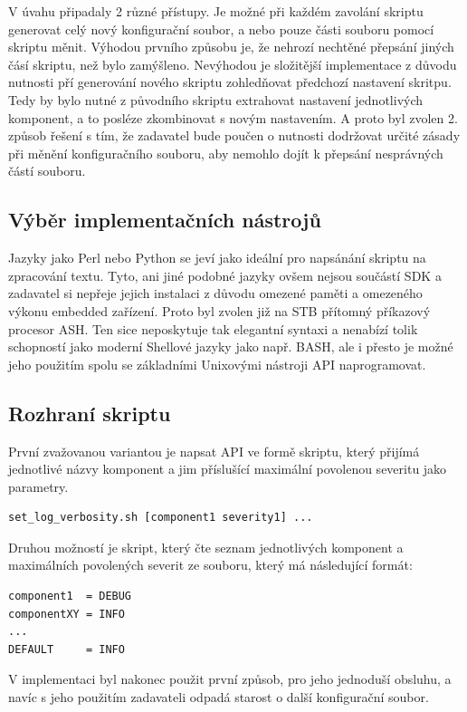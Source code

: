 \documentclass[thesis=B,czech]{FITthesis}[2012/06/26]
\begin{document}
V úvahu připadaly 2 různé přístupy. Je možné při každém zavolání skriptu generovat celý nový konfigurační soubor, a nebo pouze části souboru pomocí skriptu měnit.
Výhodou prvního způsobu je, že nehrozí nechtěné přepsání jiných čásí skriptu, než bylo zamýšleno. Nevýhodou je složitější implementace z důvodu nutnosti pří generování nového skriptu zohledňovat předchozí nastavení skritpu. Tedy by bylo nutné z původního skriptu extrahovat nastavení jednotlivých komponent, a to posléze zkombinovat s novým nastavením.
A proto byl zvolen 2. způsob řešení s tím, že zadavatel bude poučen o nutnosti dodržovat určité zásady při měnění konfiguračního souboru, aby nemohlo dojít k přepsání nesprávných částí souboru.

\subsection{Výběr implementačních nástrojů}
Jazyky jako Perl nebo Python se jeví jako ideální pro napsánání skriptu na zpracování textu. Tyto, ani jiné podobné jazyky ovšem nejsou součástí SDK  a zadavatel si nepřeje jejich instalaci z důvodu omezené paměti a omezeného výkonu embedded zařízení. Proto byl zvolen již na STB přítomný příkazový procesor ASH. Ten sice neposkytuje tak elegantní syntaxi a nenabízí tolik schopností jako moderní Shellové jazyky jako např. BASH, ale i přesto je možné jeho použitím spolu se základními Unixovými nástroji API naprogramovat.

\subsection{Rozhraní skriptu}
První zvažovanou variantou je napsat API ve formě skriptu, který přijímá jednotlivé názvy komponent a jim příslušící maximální povolenou severitu jako parametry.

\begin{lstlisting}[style=RainerScriptSimpleStyle]
set_log_verbosity.sh [component1 severity1] ...
\end{lstlisting}
Druhou možností je skript, který čte seznam jednotlivých komponent a maximálních povolených severit ze souboru, který má následující formát:

\begin{lstlisting}[style=RainerScriptSimpleStyle]
component1  = DEBUG
componentXY = INFO
...
DEFAULT     = INFO
\end{lstlisting}
V implementaci byl nakonec použit první způsob, pro jeho jednoduší obsluhu, a navíc s jeho použitím zadavateli odpadá starost o další konfigurační soubor.
\end{document}
